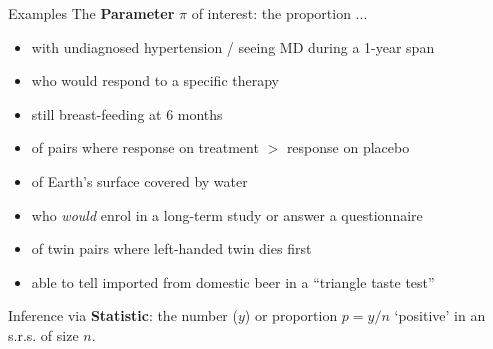 \documentclass[10pt,handout]{beamer}\usepackage[]{graphicx}\usepackage[]{color}
\begin{document}
\begin{frame}{Examples}
	\small 
	The \textbf{Parameter} $\pi$ of interest: the proportion ...
	\begin{itemize}
		\item with undiagnosed hypertension / seeing MD during a 1-year span 
		\item who would respond to a specific therapy 
		\item still breast-feeding at 6 months
		\item of pairs where response on treatment $>$  response on placebo
		\item of Earth's surface covered by water
		\item who \textit{would} enrol in a long-term study or answer a questionnaire
		\item of twin pairs where left-handed twin dies first
		\item able to tell imported from domestic beer in a ``triangle taste test''
	\end{itemize}
	
	Inference via \textbf{Statistic}: the number ($y$) or proportion $p = y/n$ `positive' in an s.r.s. of size $n$.
	
\end{frame}

\end{document}
